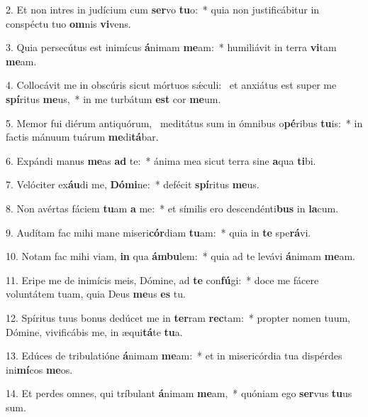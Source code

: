2. Et non intres in judícium cum \textbf{ser}vo \textbf{tu}o:~*  quia non justificábitur in conspéctu tuo \textbf{om}nis \textbf{vi}vens.\

3. Quia persecútus est inimícus \textbf{á}nimam \textbf{me}am:~*  humiliávit in terra \textbf{vi}tam \textbf{me}am.\

4. Collocávit me in obscúris sicut mórtuos sǽculi: \dag\  et anxiátus est super me \textbf{spí}ritus \textbf{me}us,~*  in me turbátum \textbf{est} cor \textbf{me}um.\

5. Memor fui diérum antiquórum, \dag\  meditátus sum in ómnibus o\textbf{pé}ribus \textbf{tu}is:~*  in factis mánuum tuárum \textbf{me}di\textbf{tá}bar.\

6. Expándi manus \textbf{me}as \textbf{ad} te:~*  ánima mea sicut terra sine \textbf{a}qua \textbf{ti}bi.\

7. Velóciter ex\textbf{áu}di me, \textbf{Dó}\textbf{mi}ne:~*  defécit \textbf{spí}ritus \textbf{me}us.\

8. Non avértas fáciem \textbf{tu}am \textbf{a} me:~*  et símilis ero descendénti\textbf{bus} in \textbf{la}cum.\

9. Audítam fac mihi mane miseri\textbf{cór}diam \textbf{tu}am:~*  quia in \textbf{te} spe\textbf{rá}vi.\

10. Notam fac mihi viam, \textbf{in} qua \textbf{ám}\textbf{bu}lem:~*  quia ad te levávi \textbf{á}nimam \textbf{me}am.\

11. Eripe me de inimícis meis, Dómine, ad \textbf{te} con\textbf{fú}gi:~*  doce me fácere voluntátem tuam, quia Deus \textbf{me}us \textbf{es} tu.\

12. Spíritus tuus bonus dedúcet me in \textbf{ter}ram \textbf{rec}tam:~*  propter nomen tuum, Dómine, vivificábis me, in æqui\textbf{tá}te \textbf{tu}a.\

13. Edúces de tribulatióne \textbf{á}nimam \textbf{me}am:~*  et in misericórdia tua dispérdes ini\textbf{mí}cos \textbf{me}os.\

14. Et perdes omnes, qui tríbulant \textbf{á}nimam \textbf{me}am,~*  quóniam ego \textbf{ser}vus \textbf{tu}us sum.\

